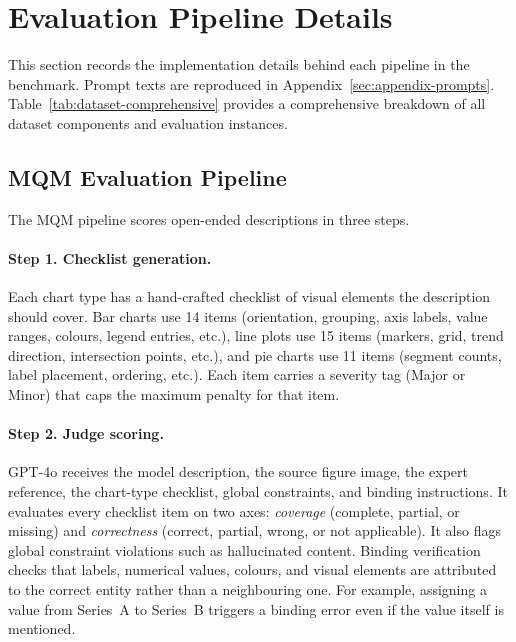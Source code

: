 
\section{Evaluation Pipeline Details}
\label{sec:appendix-eval-pipelines}

This section records the implementation details behind each pipeline in the benchmark. Prompt texts are reproduced in Appendix~\ref{sec:appendix-prompts}. Table~\ref{tab:dataset-comprehensive} provides a comprehensive breakdown of all dataset components and evaluation instances.



\subsection{MQM Evaluation Pipeline}
\label{sec:appendix-mqm-pipeline}

The MQM pipeline scores open-ended descriptions in three steps.

\paragraph{Step 1. Checklist generation.}
Each chart type has a hand-crafted checklist of visual elements the description should cover. Bar charts use 14 items (orientation, grouping, axis labels, value ranges, colours, legend entries, etc.), line plots use 15 items (markers, grid, trend direction, intersection points, etc.), and pie charts use 11 items (segment counts, label placement, ordering, etc.). Each item carries a severity tag (Major or Minor) that caps the maximum penalty for that item.

\paragraph{Step 2. Judge scoring.}
GPT-4o receives the model description, the source figure image, the expert reference, the chart-type checklist, global constraints, and binding instructions. It evaluates every checklist item on two axes: \emph{coverage} (complete, partial, or missing) and \emph{correctness} (correct, partial, wrong, or not applicable). It also flags global constraint violations such as hallucinated content. Binding verification checks that labels, numerical values, colours, and visual elements are attributed to the correct entity rather than a neighbouring one. For example, assigning a value from Series~A to Series~B triggers a binding error even if the value itself is mentioned.

